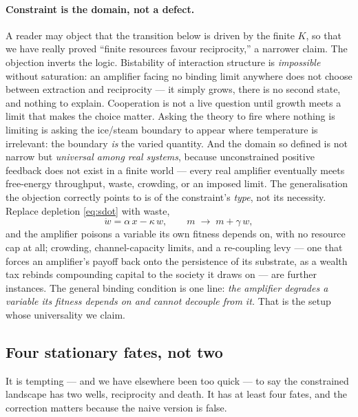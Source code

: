 \documentclass[11pt]{article}
\theoremstyle{plain}
\theoremstyle{definition}
\begin{document}
\paragraph{Constraint is the domain, not a defect.} A reader may object that the transition below is driven by the finite $K$, so that we have really proved ``finite resources favour reciprocity,'' a narrower claim. The objection inverts the logic. Bistability of interaction structure is \emph{impossible} without saturation: an amplifier facing no binding limit anywhere does not choose between extraction and reciprocity --- it simply grows, there is no second state, and nothing to explain. Cooperation is not a live question until growth meets a limit that makes the choice matter. Asking the theory to fire where nothing is limiting is asking the ice/steam boundary to appear where temperature is irrelevant: the boundary \emph{is} the varied quantity. And the domain so defined is not narrow but \emph{universal among real systems}, because unconstrained positive feedback does not exist in a finite world --- every real amplifier eventually meets free-energy throughput, waste, crowding, or an imposed limit. The generalisation the objection correctly points to is of the constraint's \emph{type}, not its necessity. Replace depletion \eqref{eq:sdot} with waste,
\begin{equation}
\dot w = \alpha\,x - \kappa\,w, \qquad m \;\to\; m + \gamma\,w,
\label{eq:waste}
\end{equation}
and the amplifier poisons a variable its own fitness depends on, with no resource cap at all; crowding, channel-capacity limits, and a re-coupling levy --- one that forces an amplifier's payoff back onto the persistence of its substrate, as a wealth tax rebinds compounding capital to the society it draws on --- are further instances. The general binding condition is one line: \emph{the amplifier degrades a variable its fitness depends on and cannot decouple from it.} That is the setup whose universality we claim.

\subsection{Four stationary fates, not two}
\label{sec:fourfates}

It is tempting --- and we have elsewhere been too quick --- to say the constrained landscape has two wells, reciprocity and death. It has at least four fates, and the correction matters because the naive version is false.
\end{document}

